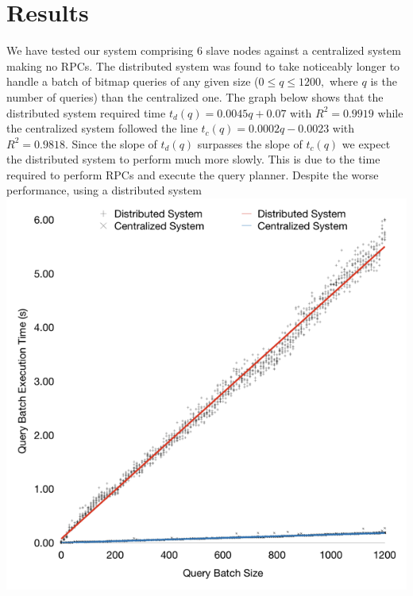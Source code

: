\section{Results}
We have tested our system comprising 6 slave nodes against a centralized
system making no RPCs. The distributed system was found to take noticeably
longer to handle a batch of bitmap queries of any given size ($0\leq q\leq 1200,$ where $q$ is the number of queries) than the centralized one. The graph below shows that the distributed
system required time $t_d(q)=0.0045q+0.07$ with $R^2=0.9919$ while the centralized system followed the line
$t_c(q)=0.0002q-0.0023$ with $R^2=0.9818$. Since the slope of $t_d(q)$ surpasses the slope of
$t_c(q)$ we expect the distributed system to perform much more slowly. This is due to
the time required to perform RPCs and execute the query planner. Despite the worse performance,
using a distributed system
\includegraphics[scale=0.25]{query-experiment-results}
